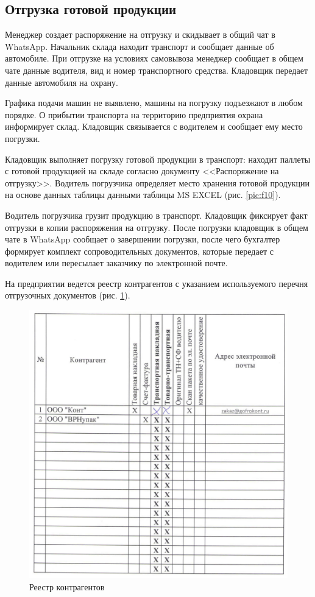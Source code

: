\newpage
\subsection{Отгрузка готовой продукции}
\label{bp:Shipment}


Менеджер создает распоряжение на отгрузку и скидывает в общий чат в WhatsApp.  Начальник склада находит транспорт и сообщает данные об автомобиле. При отгрузке на условиях самовывоза менеджер сообщает в общем чате данные водителя, вид и номер транспортного средства. Кладовщик передает данные автомобиля на охрану. 

Графика подачи машин не выявлено, машины на погрузку подъезжают в любом порядке.
О прибытии транспорта на территорию предприятия охрана информирует склад. Кладовщик связывается с водителем и сообщает ему место погрузки. 

Кладовщик выполняет погрузку готовой продукции в транспорт: находит паллеты с готовой продукцией на складе согласно документу <<Распоряжение на отгрузку>>. 
Водитель погрузчика определяет место хранения готовой продукции на основе данных таблицы  данными таблицы MS EXCEL (рис. \ref{pic:f10}). 

Водитель погрузчика грузит продукцию в транспорт. Кладовщик фиксирует факт отгрузки в копии распоряжения на отгрузку.
После погрузки кладовщик в общем чате в WhatsApp сообщает о завершении погрузки, после чего бухгалтер формирует комплект сопроводительных документов, которые передает с водителем или пересылает заказчику по электронной почте.


На предприятии ведется реестр контрагентов с указанием используемого перечня отгрузочных документов (рис. \ref{pic:f12}). 


\begin{figure}
\begin{center}
 \includegraphics[width=\linewidth, height=0.94\textheight, keepaspectratio]{Pics/f12.jpg}
\end{center}
\caption{Реестр контрагентов}
\label{pic:f12}
\end{figure}

\clearpage